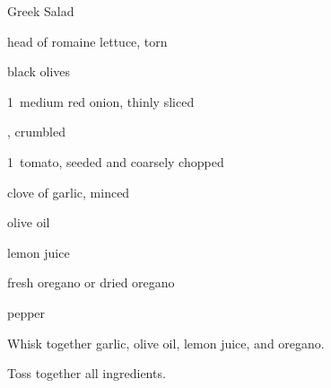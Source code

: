 \begin{recipe}{Greek Salad}{}{}

\begin{ingredients}
\item head of romaine lettuce, torn
\item \C{\half} black olives
\item 1~medium red onion, thinly sliced
\item \lbs{\half} , crumbled
\item 1~tomato, seeded and coarsely chopped
\item clove of garlic, minced
\item \C{\half} olive oil
\item {} lemon juice
\item \tp{\half} fresh oregano or \tp{\threequarter} dried oregano
\item pepper
\end{ingredients}

\begin{directions}
\item Whisk together garlic, olive oil, lemon juice, and oregano.
\item Toss together all ingredients.
\end{directions}

\end{recipe}
